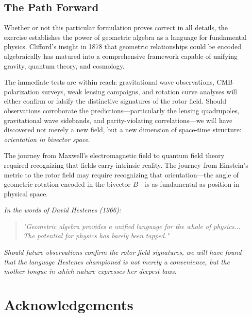 \documentclass[11pt,a4paper]{article}
\numberwithin{equation}{section}
\theoremstyle{plain}
\theoremstyle{definition}
\theoremstyle{remark}
\begin{document}
\subsection{The Path Forward}

Whether or not this particular formulation proves correct in all details, the exercise establishes the power of geometric algebra as a language for fundamental physics. Clifford's insight in 1878 that geometric relationships could be encoded algebraically has matured into a comprehensive framework capable of unifying gravity, quantum theory, and cosmology.

The immediate tests are within reach: gravitational wave observations, CMB polarization surveys, weak lensing campaigns, and rotation curve analyses will either confirm or falsify the distinctive signatures of the rotor field. Should observations corroborate the predictions—particularly the lensing quadrupoles, gravitational wave sidebands, and parity-violating correlations—we will have discovered not merely a new field, but a new dimension of space-time structure: \emph{orientation in bivector space}.

The journey from Maxwell's electromagnetic field to quantum field theory required recognizing that fields carry intrinsic reality. The journey from Einstein's metric to the rotor field may require recognizing that orientation—the angle of geometric rotation encoded in the bivector $B$—is as fundamental as position in physical space.

\vspace{2em}

\noindent\textit{In the words of David Hestenes (1966):}

\begin{quote}
\textit{"Geometric algebra provides a unified language for the whole of physics... The potential for physics has barely been tapped."}
\end{quote}

\vspace{1em}

\noindent\textit{Should future observations confirm the rotor field signatures, we will have found that the language Hestenes championed is not merely a convenience, but the mother tongue in which nature expresses her deepest laws.}

\section*{Acknowledgements}
\end{document}
